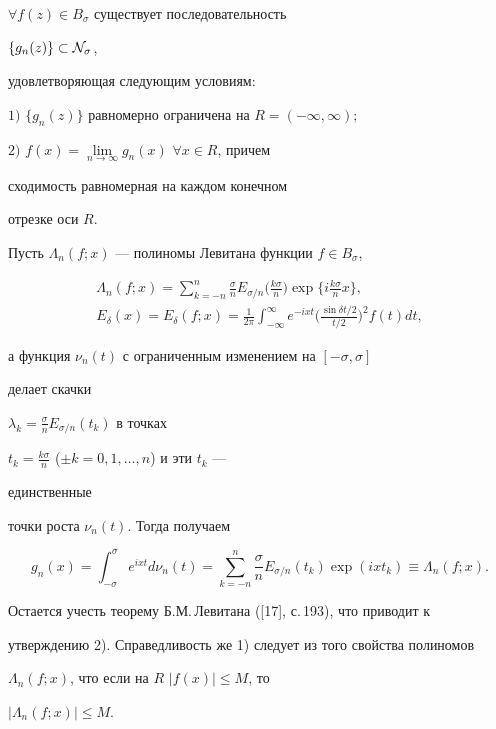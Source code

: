\begin{lem} 


$\forall f(z)\in B_\sigma$ существует последовательность 


$\{g_n(z)\}\subset\cal N_\sigma$, 


удовлетворяющая следующим условиям$:$ 


 


$1)$ $\{g_n(z)\}$ равномерно ограничена на $R=(-\infty,\infty);$ 


 


$2)$ $f(x)=\lim\limits_{n\to\infty}g_n(x)$ $\forall x\in R$, причем 


сходимость равномерная на каждом конечном 


отрезке оси $R$. 


\end{lem} 


 


\begin{pf} 


Пусть $\Lambda_n(f;x)$ --- полиномы Левитана функции $f\in B_\sigma$, 


\begin{gather*} 


\Lambda_n(f;x)=\sum^n_{k=-n}\frac{\sigma}{n}E_{\sigma/n} 


\bigg(\frac{k\sigma}{n}\bigg)\exp\bigg\{i\frac{k\sigma}{n}x \bigg\},\\ 


% 


E_\delta(x)=E_\delta(f;x)=\frac{1}{2\pi}\int^\infty_{-\infty} 


e^{-ixt}\bigg(\frac{\sin\delta t/2}{t/2} \bigg)^2 


f(t)dt, 


\end{gather*} 


а функция $\nu_n(t)$ с ограниченным изменением на $[-\sigma,\sigma]$ 


делает скачки 


$\lambda_k=\frac{\sigma}{n}E_{\sigma/n}(t_k)$ в точках 


$t_k=\frac{k\sigma}{n}$ ($\pm k=0,1,\dotsc,n$) и эти $t_k$ --- 


единственные 


точки роста $\nu_n(t)$. Тогда получаем


$$ 


g_n(x)=\int^\sigma_{-\sigma}e^{ixt}d\nu_n(t)= 


\sum^n_{k=-n}\frac{\sigma}{n}E_{\sigma/n}(t_k) 


\exp(ixt_k)\equiv\Lambda_n(f;x). 


$$ 


Остается учесть теорему Б.М.\,Левитана ([17], с.\,193), что приводит к 


утверждению 2). Справедливость же 1) следует из того свойства полиномов 


$\Lambda_n(f;x)$, что если на $R$\; $|f(x)|\le M$, то 


$|\Lambda_n(f;x)|\le M$. 


\end{pf} 


